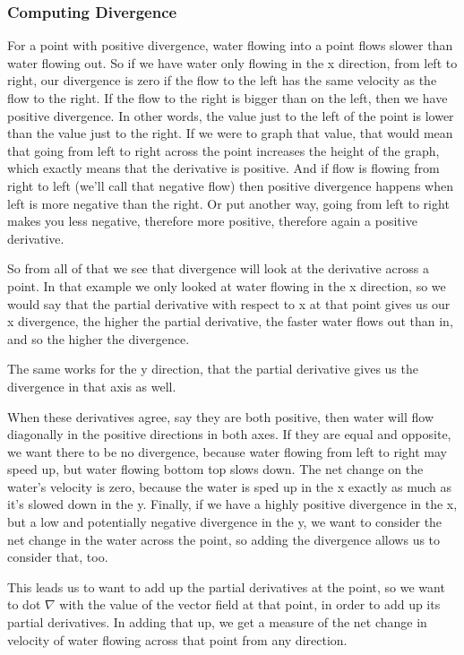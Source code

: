 \documentclass[12pt, letterpaper]{article}
\begin{document}
\subsubsection{Computing Divergence}
For a point with positive divergence, water flowing into a point flows slower than water flowing out. 
So if we have water only flowing in the x direction, from left to right, our divergence is zero if the flow to the left has the same velocity as the flow to the right.
If the flow to the right is bigger than on the left, then we have positive divergence.
In other words, the value just to the left of the point is lower than the value just to the right.
If we were to graph that value, that would mean that going from left to right across the point increases the height of the graph, which exactly means that the derivative is positive.
And if flow is flowing from right to left (we'll call that negative flow) then positive divergence happens when left is more negative than the right.
Or put another way, going from left to right makes you less negative, therefore more positive, therefore again a positive derivative.

So from all of that we see that divergence will look at the derivative across a point.
In that example we only looked at water flowing in the x direction, so we would say that the partial derivative with respect to x at that point gives us our x divergence, the higher the partial derivative, the faster water flows out than in, and so the higher the divergence.

The same works for the y direction, that the partial derivative gives us the divergence in that axis as well.

When these derivatives agree, say they are both positive, then water will flow diagonally in the positive directions in both axes.
If they are equal and opposite, we want there to be no divergence, because water flowing from left to right may speed up, but water flowing bottom top slows down.
The net change on the water's velocity is zero, because the water is sped up in the x exactly as much as it's slowed down in the y.
Finally, if we have a highly positive divergence in the x, but a low and potentially negative divergence in the y, we want to consider the net change in the water across the point,
so adding the divergence allows us to consider that, too.

This leads us to want to add up the partial derivatives at the point, so we want to dot $\nabla$ with the value of the vector field at that point, in order to add up its partial derivatives.
In adding that up, we get a measure of the net change in velocity of water flowing across that point from any direction. 
\end{document}
